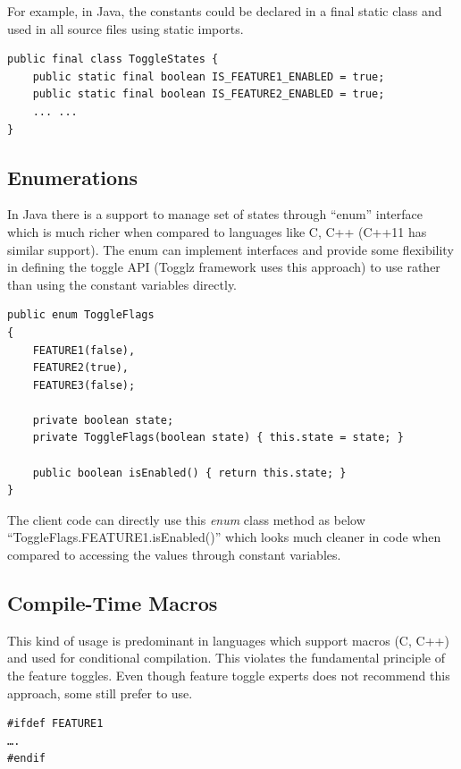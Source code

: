\documentclass[conference]{IEEEtran}
\begin{document}
For example,  in Java, the constants could be declared in a final static class and used in all source files using static imports.\\

\begin{lstlisting}
public final class ToggleStates {
    public static final boolean IS_FEATURE1_ENABLED = true;
    public static final boolean IS_FEATURE2_ENABLED = true;
    ... ...
}
\end{lstlisting}

\subsection{Enumerations}
In Java there is a support to manage set of states through “enum” interface which is much richer when compared to languages like C, C++ (C++11 has similar support). The enum can implement interfaces and provide some flexibility in defining the toggle API (Togglz framework uses this approach) to use rather than using the constant variables directly.\\

\begin{lstlisting}
public enum ToggleFlags
{
    FEATURE1(false),
    FEATURE2(true),
    FEATURE3(false);

    private boolean state;
    private ToggleFlags(boolean state) { this.state = state; }

    public boolean isEnabled() { return this.state; }
}
\end{lstlisting}

The client code can directly use this \textit{enum} class method as below ``ToggleFlags.FEATURE1.isEnabled()'' which looks much cleaner in code when compared to accessing the values through constant variables.

\subsection{Compile-Time Macros}
This kind of usage is predominant in languages which support macros (C, C++) and used for conditional compilation. This violates the fundamental principle of the feature toggles. Even though feature toggle experts does not recommend this approach, some still prefer to use.
\begin{lstlisting}
#ifdef FEATURE1
….
#endif
\end{lstlisting}
\end{document}
